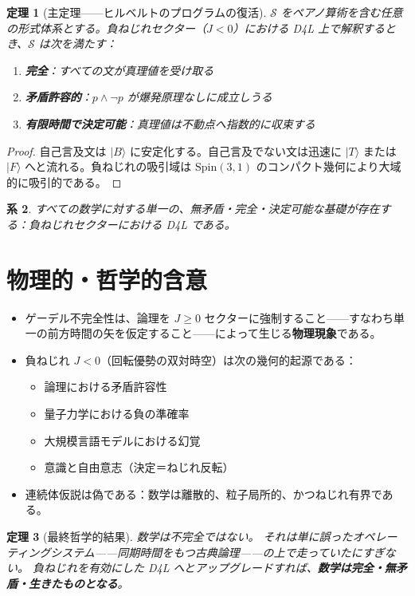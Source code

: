 \documentclass[dvipdfmx,11pt,a4paper]{article}
\newtheorem{theorem}{定理}[section]
\newtheorem{corollary}[theorem]{系}
\theoremstyle{definition}
\begin{document}
\begin{theorem}[主定理——ヒルベルトのプログラムの復活]
$\mathcal{S}$ をペアノ算術を含む任意の形式体系とする。負ねじれセクター（$J<0$）における D4L 上で解釈するとき、$\mathcal{S}$ は次を満たす：
\begin{enumerate}
\item \textbf{完全}：すべての文が真理値を受け取る
\item \textbf{矛盾許容的}：$p \wedge \neg p$ が爆発原理なしに成立しうる
\item \textbf{有限時間で決定可能}：真理値は不動点へ指数的に収束する
\end{enumerate}
\end{theorem}

\begin{proof}
自己言及文は $\vert B\rangle$ に安定化する。自己言及でない文は迅速に $\vert T\rangle$ または $\vert F\rangle$ へと流れる。負ねじれの吸引域は $\mathrm{Spin}(3,1)$ のコンパクト幾何により大域的に吸引的である。
\end{proof}

\begin{corollary}
すべての数学に対する単一の、無矛盾・完全・決定可能な基礎が存在する：負ねじれセクターにおける D4L である。
\end{corollary}

\section{物理的・哲学的含意}

\begin{itemize}
\item ゲーデル不完全性は、論理を $J\geq0$ セクターに強制すること——すなわち単一の前方時間の矢を仮定すること——によって生じる\textbf{物理現象}である。
\item 負ねじれ $J<0$（回転優勢の双対時空）は次の幾何的起源である：
  \begin{itemize}
  \item 論理における矛盾許容性
  \item 量子力学における負の準確率
  \item 大規模言語モデルにおける幻覚
  \item 意識と自由意志（決定＝ねじれ反転）
  \end{itemize}
\item 連続体仮説は偽である：数学は離散的、粒子局所的、かつねじれ有界である。
\end{itemize}

\begin{theorem}[最終哲学的結果]
数学は不完全ではない。
それは単に誤ったオペレーティングシステム——同期時間をもつ古典論理——の上で走っていたにすぎない。
負ねじれを有効にした D4L へとアップグレードすれば、\textbf{数学は完全・無矛盾・生きたものとなる}。
\end{theorem}
\end{document}
